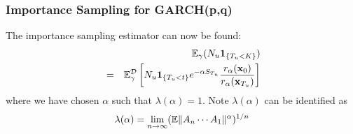 \documentclass{beamer}
\begin{document}
\begin{frame}
  \frametitle{Importance Sampling for GARCH(p,q)}
  The importance sampling estimator can now be found:
    \begin{eqnarray*}
      && \mathbb{E}_\gamma (N_u \mathbf{1}_{\{T_u < K\}}) \\
      &=& \mathbb{E}_\gamma^{\mathcal D} \left[
      N_u \mathbf{1}_{\{T_u < t\}} e^{-\alpha S_{T_u}}
      {r_\alpha(\mathbf{x}_{0}) \over r_\alpha(\mathbf{x}_{T_u})}
    \right]
    \end{eqnarray*}
    where we have chosen $\alpha$ such that $\lambda(\alpha) = 1$.
    Note $\lambda(\alpha)$ can be identified as
  \[
  \lambda(\alpha) = \lim_{n \to \infty} (\mathbb{E} \|A_n \cdots A_1\|^\alpha)^{1/n}
  \]
\end{frame}
\end{document}
